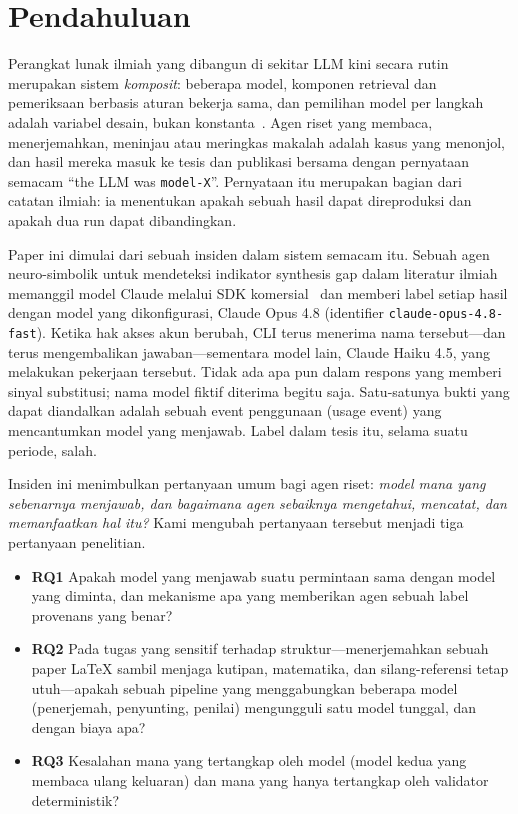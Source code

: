 \section{Pendahuluan}
\label{sec:intro}

Perangkat lunak ilmiah yang dibangun di sekitar LLM kini secara rutin merupakan sistem \emph{komposit}: beberapa model, komponen retrieval dan pemeriksaan berbasis aturan bekerja sama, dan pemilihan model per langkah adalah variabel desain, bukan konstanta~\cite{chen2024compound,chen2023frugalgpt,ong2024routellm}. Agen riset yang membaca, menerjemahkan, meninjau atau meringkas makalah adalah kasus yang menonjol, dan hasil mereka masuk ke tesis dan publikasi bersama dengan pernyataan semacam ``the LLM was \texttt{model-X}''. Pernyataan itu merupakan bagian dari catatan ilmiah: ia menentukan apakah sebuah hasil dapat direproduksi dan apakah dua run dapat dibandingkan.

Paper ini dimulai dari sebuah insiden dalam sistem semacam itu. Sebuah agen neuro-simbolik untuk mendeteksi indikator synthesis gap dalam literatur ilmiah~\cite{arya2026wizard} memanggil model Claude melalui SDK komersial~\cite{copilotsdk2026} dan memberi label setiap hasil dengan model yang dikonfigurasi, Claude Opus 4.8 (identifier \texttt{claude-opus-4.8-fast}). Ketika hak akses akun berubah, CLI terus menerima nama tersebut---dan terus mengembalikan jawaban---sementara model lain, Claude Haiku 4.5, yang melakukan pekerjaan tersebut. Tidak ada apa pun dalam respons yang memberi sinyal substitusi; nama model fiktif diterima begitu saja. Satu-satunya bukti yang dapat diandalkan adalah sebuah event penggunaan (usage event) yang mencantumkan model yang menjawab. Label dalam tesis itu, selama suatu periode, salah.

Insiden ini menimbulkan pertanyaan umum bagi agen riset: \emph{model mana yang sebenarnya menjawab, dan bagaimana agen sebaiknya mengetahui, mencatat, dan memanfaatkan hal itu?} Kami mengubah pertanyaan tersebut menjadi tiga pertanyaan penelitian.
\begin{itemize}
  \item \textbf{RQ1} Apakah model yang menjawab suatu permintaan sama dengan model yang diminta, dan mekanisme apa yang memberikan agen sebuah label provenans yang benar?
  \item \textbf{RQ2} Pada tugas yang sensitif terhadap struktur---menerjemahkan sebuah paper LaTeX sambil menjaga kutipan, matematika, dan silang-referensi tetap utuh---apakah sebuah pipeline yang menggabungkan beberapa model (penerjemah, penyunting, penilai) mengungguli satu model tunggal, dan dengan biaya apa?
  \item \textbf{RQ3} Kesalahan mana yang tertangkap oleh model (model kedua yang membaca ulang keluaran) dan mana yang hanya tertangkap oleh validator deterministik?
\end{itemize}

